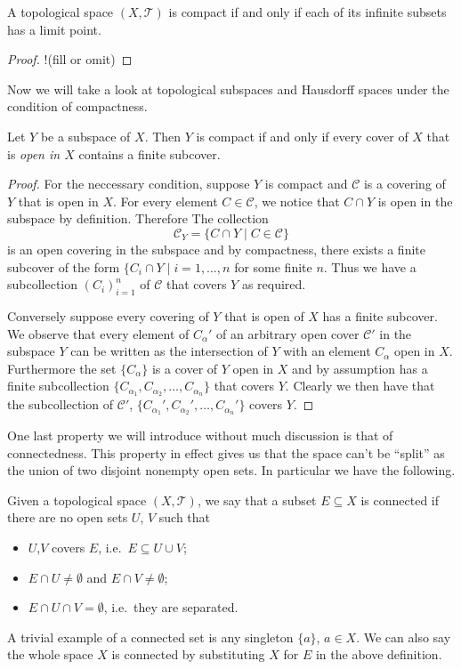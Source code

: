 \begin{thm}
  A topological space $(X, \mathscr{T})$ is compact if and only if
  each of its infinite subsets has a limit point.
\end{thm}

\begin{proof}
  !(fill or omit)
\end{proof}

Now we will take a look at topological subspaces and Hausdorff spaces
under the condition of compactness.

\begin{lem}
  Let $Y$ be a subspace of $X$. Then $Y$ is compact if and only if
  every cover of $X$ that is \emph{open in $X$} contains a finite
  subcover.
\end{lem}

\begin{proof}
  For the neccessary condition, suppose $Y$ is compact and
  $\mathscr{C}$ is a covering of $Y$ that is open in $X$. For every
  element $C \in \mathscr{C}$, we notice that $C \cap Y$ is open in
  the subspace by definition. Therefore The collection
  \[
    \mathscr{C}_Y = \{ C \cap Y \mid C \in \mathscr{C} \}
  \]
  is an open covering in the subspace and by compactness, there exists
  a finite subcover of the form $\{C_i \cap Y \mid i = 1, \dots,
  n$ for some finite $n$. Thus we have a subcollection $(C_i)_{i=1}^n$
  of $\mathscr{C}$ that covers $Y$ as required.

  Conversely suppose every covering of $Y$ that is open of $X$ has a
  finite subcover. We observe that every element of $C_\alpha'$ of an
  arbitrary open cover $\mathscr{C}'$ in the subspace $Y$ can be
  written as the intersection of $Y$ with an element $C_\alpha$ open
  in $X$. Furthermore the set $\{C_\alpha \}$ is a cover of $Y$ open
  in $X$ and by assumption has a finite subcollection $\{C_{\alpha_1},
  C_{\alpha_2}, \dots, C_{\alpha_n} \}$ that covers $Y$. Clearly we
  then have that the subcollection of $\mathscr{C}'$,
  $\{C_{\alpha_1}', C_{\alpha_2}', \dots, C_{\alpha_n}' \}$ covers
  $Y$. 
\end{proof}

One last property we will introduce without much discussion is that of
connectedness. This property in effect gives us that the space can't
be ``split'' as the union of two disjoint nonempty open sets. In
particular we have the following.

\begin{defn}
  Given a topological space $(X,\mathscr{T})$, we say that a subset $E
  \subseteq X$ is connected if there are no open sets $U$, $V$ such that
  \begin{itemize}
  \item $U$,$V$ covers $E$, i.e.\ $E \subseteq U \cup V$;
  \item $E \cap U \not= \emptyset$ and $E \cap V \not= \emptyset$;
  \item $E \cap U \cap V = \emptyset$, i.e.\ they are separated.
  \end{itemize}
\end{defn}

A trivial example of a connected set is any singleton $\{a \}$, $a \in
X$. We can also say the whole space $X$ is connected by substituting
$X$ for $E$ in the above definition.

